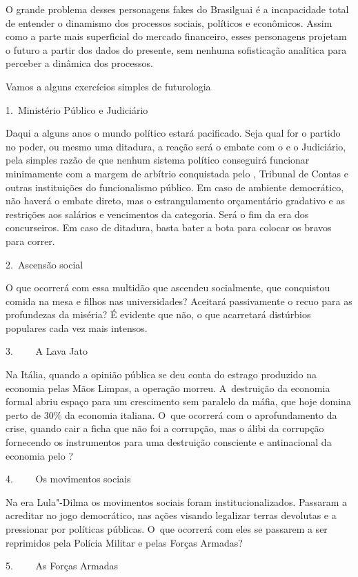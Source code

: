 O grande problema desses personagens fakes do Brasilguai é a
incapacidade total de entender o dinamismo dos processos sociais,
políticos e econômicos. Assim como a parte mais superficial do mercado
financeiro, esses personagens projetam o futuro a partir dos dados do
presente, sem nenhuma sofisticação analítica para perceber a dinâmica
dos processos.

Vamos a alguns exercícios simples de futurologia

1.~Ministério Público e Judiciário

Daqui a alguns anos o mundo político estará pacificado. Seja qual for o
partido no poder, ou mesmo uma ditadura, a reação será o embate com o
 e o Judiciário, pela simples razão de que nenhum sistema político
conseguirá funcionar minimamente com a margem de arbítrio conquistada
pelo , Tribunal de Contas e outras instituições do funcionalismo
público. Em caso de ambiente democrático, não haverá o embate direto,
mas o estrangulamento orçamentário gradativo e as restrições aos
salários e vencimentos da categoria. Será o fim da era dos concurseiros.
Em caso de ditadura, basta bater a bota para colocar os bravos para
correr.

2.~Ascensão social

O que ocorrerá com essa multidão que ascendeu socialmente, que
conquistou comida na mesa e filhos nas universidades? Aceitará
passivamente o recuo para as profundezas da miséria? É evidente que não,
o que acarretará distúrbios populares cada vez mais intensos.

3.~~~~ A Lava Jato

Na Itália, quando a opinião pública se deu conta do estrago produzido na
economia pelas Mãos Limpas, a operação morreu. A~destruição da economia
formal abriu espaço para um crescimento sem paralelo da máfia, que hoje
domina perto de 30\% da economia italiana. O~que ocorrerá com o
aprofundamento da crise, quando cair a ficha que não foi a corrupção,
mas o álibi da corrupção fornecendo os instrumentos para uma destruição
consciente e antinacional da economia pelo ?

4.~~~~ Os movimentos sociais

Na era Lula"-Dilma os movimentos sociais foram institucionalizados.
Passaram a acreditar no jogo democrático, nas ações visando legalizar
terras devolutas e a pressionar por políticas públicas. O~que ocorrerá
com eles se passarem a ser reprimidos pela Polícia Militar e pelas
Forças Armadas?

5.~~~~ As Forças Armadas

